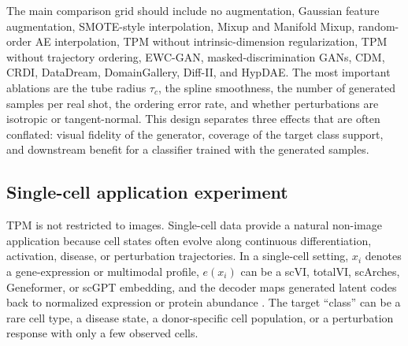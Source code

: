 \documentclass[preprint,12pt,number]{elsarticle}
\def\V#1{\boldsymbol{\mathit#1}}          %
\begin{document}
The main comparison grid should include no augmentation, Gaussian feature augmentation, SMOTE-style interpolation, Mixup and Manifold Mixup, random-order AE interpolation, TPM without intrinsic-dimension regularization, TPM without trajectory ordering, EWC-GAN, masked-discrimination GANs, CDM, CRDI, DataDream, DomainGallery, Diff-II, and HypDAE. The most important ablations are the tube radius $\tau_c$, the spline smoothness, the number of generated samples per real shot, the ordering error rate, and whether perturbations are isotropic or tangent-normal. This design separates three effects that are often conflated: visual fidelity of the generator, coverage of the target class support, and downstream benefit for a classifier trained with the generated samples.

\subsection{Single-cell application experiment}
TPM is not restricted to images. Single-cell data provide a natural non-image application because cell states often evolve along continuous differentiation, activation, disease, or perturbation trajectories. In a single-cell setting, $\V{x}_i$ denotes a gene-expression or multimodal profile, $e(\V{x}_i)$ can be a scVI, totalVI, scArches, Geneformer, or scGPT embedding, and the decoder maps generated latent codes back to normalized expression or protein abundance \citep{lopez2018deep, gayoso2021joint, lotfollahi2022mapping, theodoris2023transfer, cui2024scgpt}. The target ``class'' can be a rare cell type, a disease state, a donor-specific cell population, or a perturbation response with only a few observed cells.
\end{document}
